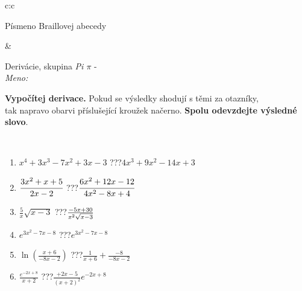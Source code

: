 \documentclass[10pt]{report}
\begin{document}
\begin{tabular}{c:c}
\begin{minipage}[c][104.5mm][t]{0.5\linewidth}
\begin{center}
\begin{minipage}{0.20\linewidth}
\begin{center}
{\small Písmeno Braillovej abecedy}
\end{center}
\end{minipage}
\end{center}
\end{minipage}
&
\begin{minipage}[c][104.5mm][t]{0.5\linewidth}
\begin{center}
\vspace{7mm}
{\huge Derivácie, skupina \textit{Pi $\pi$} -}\\[5mm]
\textit{Meno:}\phantom{xxxxxxxxxxxxxxxxxxxxxxxxxxxxxxxxxxxxxxxxxxxxxxxxxxxxxxxxxxxxxxxxx}\\[5mm]
\begin{minipage}{0.95\linewidth}
\begin{center}
\textbf{Vypočítej derivace.} Pokud se výsledky shodují s těmi za otazníky,\\tak napravo obarvi příslušející kroužek načerno. \textbf{Spolu odevzdejte výsledné slovo}.
\end{center}
\end{minipage}
\\[1mm]
\begin{minipage}{0.79\linewidth}
\begin{center}
\begin{varwidth}{\linewidth}
\begin{enumerate}
\normalsize
\item $x^4+3x^3-7x^2+3x-3$\quad \dotfill\; ???\;\dotfill \quad $4x^3+9x^2-14x+3$
\item $\cfrac{3x^2+x+5}{2x-2}$\quad \dotfill\; ???\;\dotfill \quad $\cfrac{6x^2+12x-12}{4x^2-8x+4}$
\item $\frac{5}{x}\sqrt{x-3}$\quad \dotfill\; ???\;\dotfill \quad $\frac{-5x+30}{x^2 \sqrt{\smash[b]{x-3}}}$
\item $e^{3x^2-7x-8}$\quad \dotfill\; ???\;\dotfill \quad $e^{3x^2-7x-8}$
\item $\ln{\left(\frac{x+6}{-8x-2}\right)}$\quad \dotfill\; ???\;\dotfill \quad $\frac{1}{x+6}+\frac{-8}{-8x-2}$
\item $\frac{e^{-2x+8}}{x+2}$\quad \dotfill\; ???\;\dotfill \quad $\frac{+2x-5}{(x+2)^2}e^{-2x+8}$
\end{enumerate}
\end{varwidth}
\end{center}
\end{minipage}
\begin{minipage}{0.20\linewidth}
\begin{center}

\end{center}
\end{minipage}
\end{center}
\end{minipage}
\end{tabular}
\end{document}
